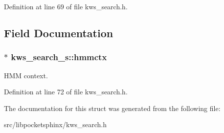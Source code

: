 Definition at line 69 of file kws\+\_\+search.\+h.



\subsection{Field Documentation}
\subsubsection[{hmmctx}]{$\ast$ kws\+\_\+search\+\_\+s\+::hmmctx}\label{structkws__search__s_a0069d57702f921cbd1e2093148e7b672}


H\+M\+M context. 



Definition at line 72 of file kws\+\_\+search.\+h.



The documentation for this struct was generated from the following file\+:\begin{DoxyCompactItemize}
\item 
src/libpocketsphinx/kws\+\_\+search.\+h\end{DoxyCompactItemize}
